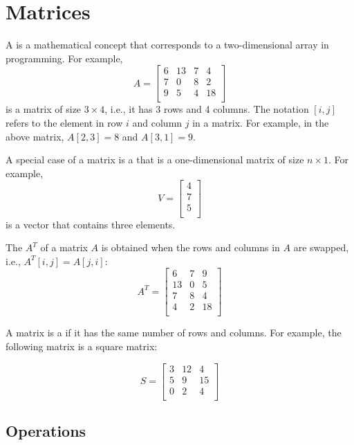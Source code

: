 \chapter{Matrices}


A  is a mathematical concept
that corresponds to a two-dimensional array
in programming. For example,
\[
A = 
 \begin{bmatrix}
  6 & 13 & 7 & 4 \\
  7 & 0 & 8 & 2 \\
  9 & 5 & 4 & 18 \\
 \end{bmatrix}
\]
is a matrix of size $3 \times 4$, i.e.,
it has 3 rows and 4 columns.
The notation $[i,j]$ refers to
the element in row $i$ and column $j$
in a matrix.
For example, in the above matrix,
$A[2,3]=8$ and $A[3,1]=9$.


A special case of a matrix is a 
that is a one-dimensional matrix of size $n \times 1$.
For example,
\[
V =
\begin{bmatrix}
4 \\
7 \\
5 \\
\end{bmatrix}
\]
is a vector that contains three elements.


The  $A^T$ of a matrix $A$
is obtained when the rows and columns in $A$
are swapped, i.e., $A^T[i,j]=A[j,i]$:
\[
A^T = 
 \begin{bmatrix}
  6 & 7 & 9 \\
  13 & 0 & 5 \\
  7 & 8 & 4 \\
  4 & 2 & 18 \\
 \end{bmatrix}
\]


A matrix is a  if it
has the same number of rows and columns.
For example, the following matrix is a
square matrix:

\[
S = 
 \begin{bmatrix}
  3 & 12 & 4  \\
  5 & 9 & 15  \\
  0 & 2 & 4 \\
 \end{bmatrix}
\]

\section{Operations}

